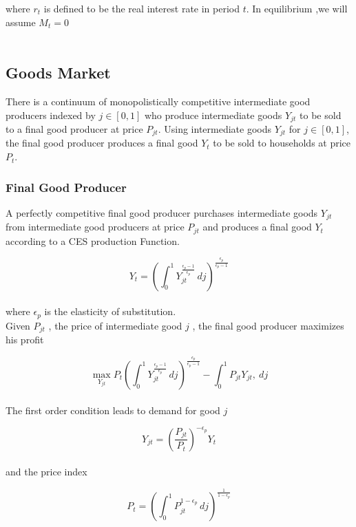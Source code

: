 \documentclass[titlepage]{\econtex}\providecommand{\texname}{BufferStockTheory}
\begin{document}
where $r_{t}$ is defined to be the real interest rate in period $t$. 
In equilibrium ,we will assume $M_{t} =0$ \\ \\

\hypertarget{Goods Market}{}
\subsection{Goods Market}

There is a continuum of  monopolistically competitive intermediate good producers indexed by $j \in [0,1]$ who produce intermediate goods $Y_{jt}$ to be sold to a final good producer at price $P_{jt}$. Using intermediate goods $Y_{jt}$ for $j \in [0,1]$, the  final good producer produces a final good $Y_{t}$ to be sold to households at price $P_{t}$.  \\ 


\hypertarget{Final Good Producer}{}
\subsubsection{Final Good Producer}

A perfectly competitive final good producer purchases intermediate goods $Y_{jt}$ from intermediate good producers at price $P_{jt}$ and produces a final good $Y_{t}$ according to a CES production Function. 

$$ Y_{t} = \left(\int_{0}^{1} Y_{jt}^{\frac{\epsilon_{p}-1}{\epsilon_{p}}}\, dj\right)^{\frac{\epsilon_{p}}{\epsilon_{p}-1}}$$ \\

where $\epsilon_{p}$ is the elasticity of substitution. \\ 

Given $P_{jt}$ , the price of intermediate good $j$ ,  the final good producer maximizes his profit

$$ \max_{Y_{jt}} P_{t} \left(\int_{0}^{1} Y_{jt}^{\frac{\epsilon_{p}-1}{\epsilon_{p}}}\, dj\right)^{\frac{\epsilon_{p}}{\epsilon_{p}-1}} - \int_{0}^{1} P_{jt} Y_{jt} ,\ dj $$ \\


The first order condition leads to demand for good $j$

$$ Y_{jt} = \left(\frac {P_{jt}}{P_{t}}\right)^{- \epsilon_{p}} Y_{t}$$ \\

and the price index

$$P_{t} = \left(\int_{0}^{1} P_{jt}^{1-\epsilon_{p}}\,dj \right )^{\frac{1}{1-\epsilon_{p}}}$$
\end{document}
